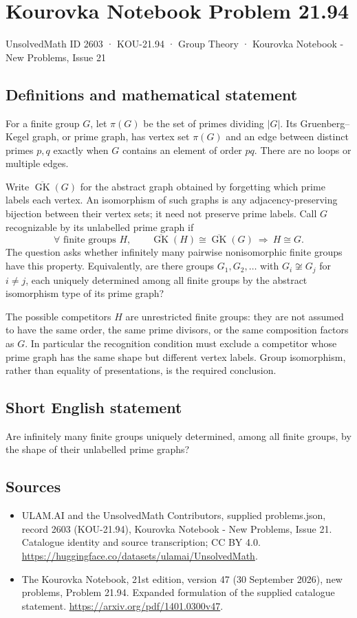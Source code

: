\documentclass[11pt,a4paper]{article}
\begin{document}
\section*{Kourovka Notebook Problem 21.94}\label{2603}
{\small UnsolvedMath ID 2603 · KOU-21.94 · Group Theory · Kourovka Notebook - New Problems, Issue 21}
\subsection{Definitions and mathematical statement}
For a finite group $G$, let $\pi(G)$ be the set of primes dividing $|G|$. Its Gruenberg--Kegel graph, or prime graph, has vertex set $\pi(G)$ and an edge between distinct primes $p,q$ exactly when $G$ contains an element of order $pq$. There are no loops or multiple edges.

Write $\overline{\operatorname{GK}}(G)$ for the abstract graph obtained by forgetting which prime labels each vertex. An isomorphism of such graphs is any adjacency-preserving bijection between their vertex sets; it need not preserve prime labels. Call $G$ recognizable by its unlabelled prime graph if
\[
 \forall\text{ finite groups }H,\qquad
 \overline{\operatorname{GK}}(H)\cong
 \overline{\operatorname{GK}}(G)\ \Longrightarrow\ H\cong G.
\]
The question asks whether infinitely many pairwise nonisomorphic finite groups have this property. Equivalently, are there groups $G_1,G_2,\ldots$ with $G_i\not\cong G_j$ for $i\ne j$, each uniquely determined among all finite groups by the abstract isomorphism type of its prime graph?

The possible competitors $H$ are unrestricted finite groups: they are not assumed to have the same order, the same prime divisors, or the same composition factors as $G$. In particular the recognition condition must exclude a competitor whose prime graph has the same shape but different vertex labels. Group isomorphism, rather than equality of presentations, is the required conclusion.
\subsection{Short English statement}
Are infinitely many finite groups uniquely determined, among all finite groups, by the shape of their unlabelled prime graphs?
\subsection{Sources}
\begin{itemize}
\item[S1] ULAM.AI and the UnsolvedMath Contributors, supplied problems.json, record 2603 (KOU-21.94), Kourovka Notebook - New Problems, Issue 21. Catalogue identity and source transcription; CC BY 4.0.
\url{https://huggingface.co/datasets/ulamai/UnsolvedMath}.
\item[S2] The Kourovka Notebook, 21st edition, version 47 (30 September 2026), new problems, Problem 21.94. Expanded formulation of the supplied catalogue statement.
\url{https://arxiv.org/pdf/1401.0300v47}.
\end{itemize}
\end{document}
